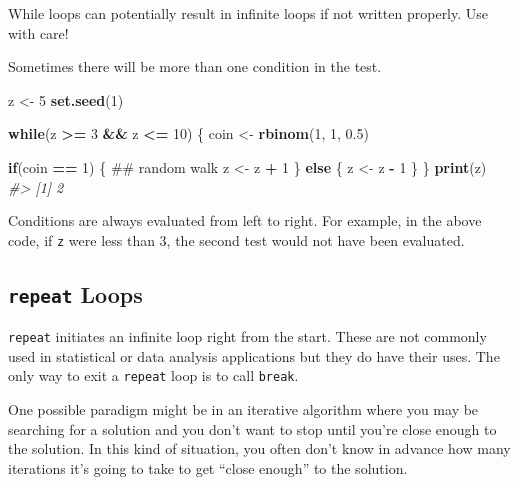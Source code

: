 \documentclass[]{book}
\newenvironment{Shaded}{\begin{snugshade}}{\end{snugshade}}
\newcommand{\KeywordTok}[1]{\textcolor[rgb]{0.13,0.29,0.53}{\textbf{#1}}}
\newcommand{\DecValTok}[1]{\textcolor[rgb]{0.00,0.00,0.81}{#1}}
\newcommand{\FloatTok}[1]{\textcolor[rgb]{0.00,0.00,0.81}{#1}}
\newcommand{\StringTok}[1]{\textcolor[rgb]{0.31,0.60,0.02}{#1}}
\newcommand{\CommentTok}[1]{\textcolor[rgb]{0.56,0.35,0.01}{\textit{#1}}}
\newcommand{\ControlFlowTok}[1]{\textcolor[rgb]{0.13,0.29,0.53}{\textbf{#1}}}
\newcommand{\OperatorTok}[1]{\textcolor[rgb]{0.81,0.36,0.00}{\textbf{#1}}}
\newcommand{\NormalTok}[1]{#1}
\theoremstyle{definition}
\theoremstyle{definition}
\theoremstyle{definition}
\theoremstyle{remark}
\let\BeginKnitrBlock\begin \let\EndKnitrBlock\end
\begin{document}
\BeginKnitrBlock{rmdwarning}
While loops can potentially result in infinite loops if not written
properly. Use with care!
\EndKnitrBlock{rmdwarning}

Sometimes there will be more than one condition in the test.

\begin{Shaded}
\begin{Highlighting}[]
\NormalTok{z <-}\StringTok{ }\DecValTok{5}
\KeywordTok{set.seed}\NormalTok{(}\DecValTok{1}\NormalTok{)}

\ControlFlowTok{while}\NormalTok{(z }\OperatorTok{>=}\StringTok{ }\DecValTok{3} \OperatorTok{&&}\StringTok{ }\NormalTok{z }\OperatorTok{<=}\StringTok{ }\DecValTok{10}\NormalTok{) \{}
\NormalTok{        coin <-}\StringTok{ }\KeywordTok{rbinom}\NormalTok{(}\DecValTok{1}\NormalTok{, }\DecValTok{1}\NormalTok{, }\FloatTok{0.5}\NormalTok{)}
        
        \ControlFlowTok{if}\NormalTok{(coin }\OperatorTok{==}\StringTok{ }\DecValTok{1}\NormalTok{) \{  ## random walk}
\NormalTok{                z <-}\StringTok{ }\NormalTok{z }\OperatorTok{+}\StringTok{ }\DecValTok{1}
\NormalTok{        \} }\ControlFlowTok{else}\NormalTok{ \{}
\NormalTok{                z <-}\StringTok{ }\NormalTok{z }\OperatorTok{-}\StringTok{ }\DecValTok{1}
\NormalTok{        \} }
\NormalTok{\}}
\KeywordTok{print}\NormalTok{(z)}
\CommentTok{#> [1] 2}
\end{Highlighting}
\end{Shaded}

Conditions are always evaluated from left to right. For example, in the
above code, if \texttt{z} were less than 3, the second test would not
have been evaluated.

\subsection{\texorpdfstring{\texttt{repeat}
Loops}{repeat Loops}}\label{repeat-loops}

\texttt{repeat} initiates an infinite loop right from the start. These
are not commonly used in statistical or data analysis applications but
they do have their uses. The only way to exit a \texttt{repeat} loop is
to call \texttt{break}.

One possible paradigm might be in an iterative algorithm where you may
be searching for a solution and you don't want to stop until you're
close enough to the solution. In this kind of situation, you often don't
know in advance how many iterations it's going to take to get ``close
enough'' to the solution.
\end{document}

